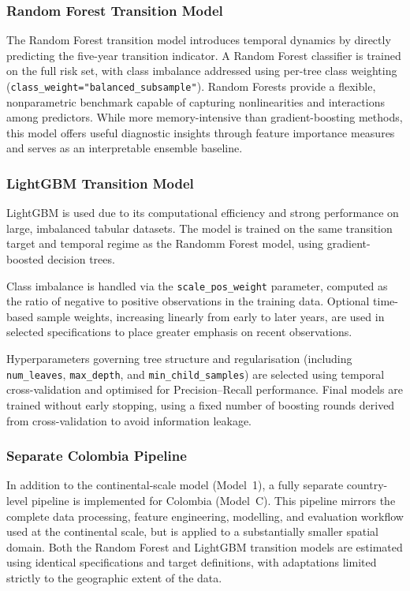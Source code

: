 \documentclass[12pt]{article}
\theoremstyle{break} %
\begin{document}
\subsubsection{Random Forest Transition Model}
\label{RF}

The Random Forest transition model introduces temporal dynamics by directly predicting the five-year transition indicator. A Random Forest classifier is trained on the full risk set, with class imbalance addressed using per-tree class weighting (\texttt{class\_weight="balanced\_subsample"}). Random Forests provide a flexible, nonparametric benchmark capable of capturing nonlinearities and interactions among predictors. While more memory-intensive than gradient-boosting methods, this model offers useful diagnostic insights through feature importance measures and serves as an interpretable ensemble baseline.

\subsubsection{LightGBM Transition Model}
\label{LGBM}

LightGBM is used due to its computational efficiency and strong performance on large, imbalanced tabular datasets. The model is trained on the same transition target and temporal regime as the Randomm Forest model, using gradient-boosted decision trees.

Class imbalance is handled via the \texttt{scale\_pos\_weight} parameter, computed as the ratio of negative to positive observations in the training data. Optional time-based sample weights, increasing linearly from early to later years, are used in selected specifications to place greater emphasis on recent observations.

Hyperparameters governing tree structure and regularisation (including \texttt{num\_leaves}, \texttt{max\_depth}, and \texttt{min\_child\_samples}) are selected using temporal cross-validation and optimised for Precision--Recall performance. Final models are trained without early stopping, using a fixed number of boosting rounds derived from cross-validation to avoid information leakage.

\subsubsection{Separate Colombia Pipeline}
\label{colombia}

In addition to the continental-scale model (Model~1), a fully separate country-level pipeline is implemented for Colombia (Model~C). This pipeline mirrors the complete data processing, feature engineering, modelling, and evaluation workflow used at the continental scale, but is applied to a substantially smaller spatial domain. Both the Random Forest and LightGBM transition models are estimated using identical specifications and target definitions, with adaptations limited strictly to the geographic extent of the data.
\end{document}

